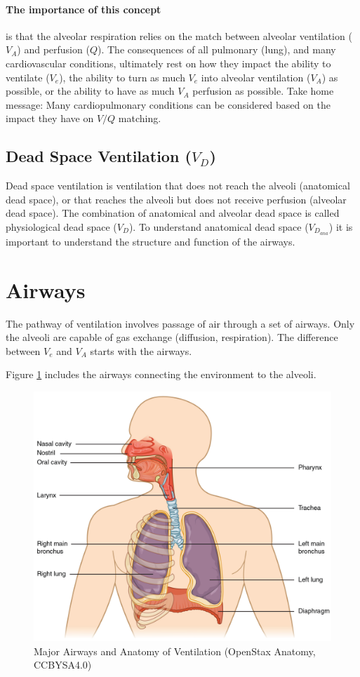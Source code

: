 \paragraph{The importance of this concept} is that the alveolar respiration relies on the match between alveolar ventilation ($V_A$) and perfusion ($Q$). The consequences of all pulmonary (lung), and many cardiovascular conditions, ultimately rest on how they impact the ability to ventilate ($V_e$), the ability to turn as much $V_e$ into alveolar ventilation ($V_A$) as possible, or the ability to have as much $V_A$ perfusion as possible. Take home message: Many cardiopulmonary conditions can be considered based on the impact they have on $V/Q$ matching.

\subsection{Dead Space Ventilation ($V_D$)}
Dead space ventilation is ventilation that does not reach the alveoli (anatomical dead space), or that reaches the alveoli but does not receive perfusion (alveolar dead space). The combination of anatomical and alveolar dead space is called physiological dead space ($V_D$). To understand anatomical dead space ($V_D_{ana}$) it is important to understand the structure and function of the airways.

\section{Airways}

The pathway of ventilation involves passage of air through a set of airways. Only the alveoli are capable of gas exchange (diffusion, respiration). The difference between $V_e$ and $V_A$ starts with the airways.  

Figure \ref{fig:airways} includes the airways connecting the environment to the alveoli.

\begin{figure}[!h]
    \centering
    \includegraphics[width=0.5 \linewidth]{./figure/ventilation/airways.jpg}
    \caption{Major Airways and Anatomy of Ventilation \footnotesize{(OpenStax Anatomy, CCBYSA4.0)}}
    \label{fig:airways}
\end{figure}

